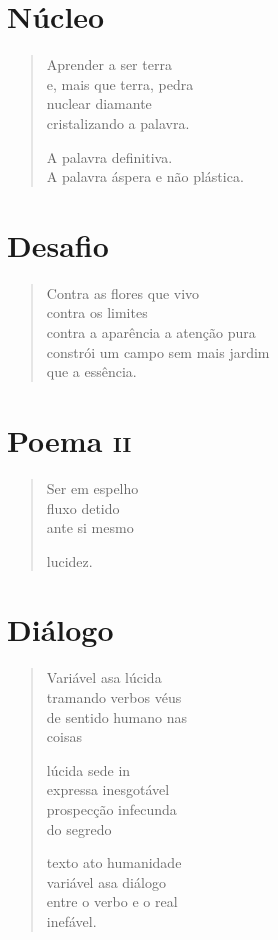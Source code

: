\chapter{Núcleo}

\begin{verse}
Aprender a ser terra\\
e, mais que terra, pedra\\
nuclear diamante\\
cristalizando a palavra.

A palavra definitiva.\\
A palavra áspera e não plástica.
\end{verse}

\chapter{Desafio}

\begin{verse}
Contra as flores que vivo\\
contra os limites\\
contra a aparência a atenção pura\\
constrói um campo sem mais jardim\\
que a essência.
\end{verse}

\chapter{Poema \textsc{ii}}

\begin{verse}
Ser em espelho\\
fluxo detido\\
ante si mesmo

lucidez.
\end{verse}

\chapter{Diálogo}

\begin{verse}
Variável asa lúcida\\
tramando verbos véus\\
de sentido humano nas\\
coisas

lúcida sede in\\
expressa inesgotável\\
prospecção infecunda\\
do segredo

texto ato humanidade\\
variável asa diálogo\\
entre o verbo e o real\\
inefável.
\end{verse}

